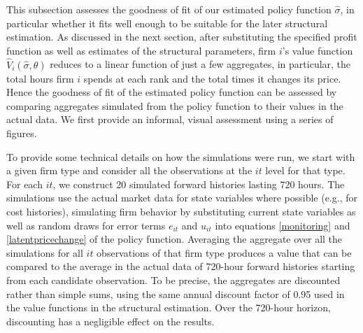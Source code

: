 \documentclass[11pt]{article}
\begin{document}
\begin{spacing}{1.3}
This subsection assesses the goodness of fit of our estimated policy
function $\hat{\sigma}$, in particular whether it fits well enough to
be suitable for the later structural estimation. As discussed in the
next section, after substituting the specified profit function as well
as estimates of the structural parameters, firm $i$'s value function
$\widehat{V}_{i}\left(\hat{\sigma},\theta \right)$ reduces to a linear
function of just a few aggregates, in particular, the total hours firm
$i$ spends at each rank and the total times it changes its
price. Hence the goodness of fit of the estimated policy function can
be assessed by comparing aggregates simulated from the policy function
to their values in the actual data. We first provide an informal,
visual assessment using a series of figures.

To provide some technical details on how the simulations were run, we
start with a given firm type and consider all the observations at the
$it$ level for that type. For each $it$, we construct 20 simulated
forward histories lasting 720 hours. The simulations use the actual
market data for state variables where possible (e.g., for cost
histories), simulating firm behavior by substituting current state
variables as well as random draws for error terms $e_{it}$ and
$u_{it}$ into equations \eqref{monitoring} and
\eqref{latentpricechange} of the policy function. Averaging the
aggregate over all the simulations for all $it$ observations of that
firm type produces a value that can be compared to the average in the
actual data of 720-hour forward histories starting from each candidate
observation. To be precise, the aggregates are discounted rather than
simple sums, using the same annual discount factor of 0.95 used in the
value functions in the structural estimation. Over the 720-hour
horizon, discounting has a negligible effect on the results.


\end{spacing}
\end{document}

